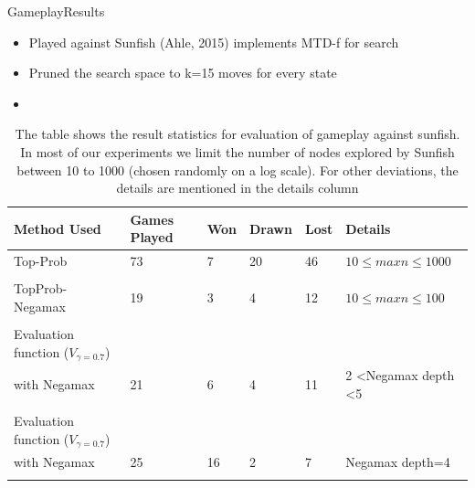 \documentclass[9pt, unknownkeysallowed]{beamer}
\begin{document}
\begin{frame}{Gameplay}{Results}
\begin{itemize}
 \item Played against Sunfish (Ahle, 2015) implements MTD-f for search
 \item Pruned the search space to k=15 moves for every state
 \item 
\end{itemize}
\begin{table}[width=1.0\textwidth]
\tiny
\centering
\begin{tabular}{@{}llllll@{}}
\toprule
{\bf Method Used} & Games Played & Won & Drawn & Lost & 
Details                      \\ \midrule
Top-Prob          & 73           & 7         & 20          & 46         & 
$10\leq maxn\leq 1000$ \\\\
TopProb-Negamax&19     &3        &4		   & 12           & 
$10\leq maxn\leq 100$ \\\\
Evaluation function ($V_{\gamma=0.7}$)&&&&&\\
with Negamax &   21      & 6  &   4           & 11       &  2 \textless Negamax 
depth \textless 5 \\\\
Evaluation function ($V_{\gamma=0.7}$)&&&&&\\
with Negamax& 25        &  16 & 2             & 7       & Negamax depth=4       
                      \\\\
  
  
  
                      \bottomrule
\end{tabular}
\caption[Results against negamax]{The table shows the result statistics for 
evaluation of gameplay against sunfish. 
In most of our experiments we limit the 
number of nodes explored by 
Sunfish between 10 to 1000 (chosen randomly on a log scale). For other 
deviations, the details are mentioned in the details column}
\end{table}
\end{frame}
\end{document}
